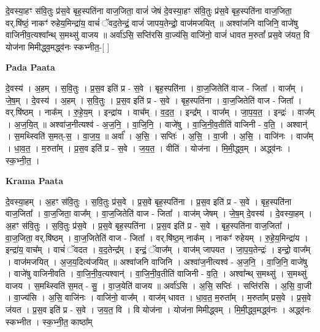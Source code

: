 \documentclass[17pt]{extarticle}
\begin{document}
दे॒वस्या॒हꣳ स॑वि॒तुः प्र॑स॒वे बृह॒स्पति॑ना वाज॒जिता॒ वाजं॑ जेषं दे॒वस्या॒हꣳ स॑वि॒तुः प्र॑स॒वे बृह॒स्पति॑ना वाज॒जिता॒ वर्.षि॑ष्ठं॒ नाकꣳ॑ रुहेय॒मिन्द्रा॑य॒ वाचं॑ ॅवद॒तेन्द्रं॒ वाजं॑ जापय॒तेन्द्रो॒ वाज॑मजयित् ॥ अश्वा॑जनि वाजिनि॒ वाजे॑षु वाजिनीव॒त्यश्वा᳚न्थ् स॒मथ्सु॑ वाजय ॥ अर्वा॑ऽसि॒ सप्ति॑रसि वा॒ज्य॑सि॒ वाजि॑नो॒ वाजं॑ धावत म॒रुतां᳚ प्रस॒वे ज॑यत॒ वि योज॑ना मिमीद्ध्व॒मद्ध्व॑नः स्कभ्नीत॒-[ ] \newline

\textbf{Pada Paata} \newline

दे॒वस्य॑ । अ॒हम् । स॒वि॒तुः । प्र॒स॒व इति॑ प्र - स॒वे । बृह॒स्पति॑ना । वा॒ज॒जितेति॑ वाज - जिता᳚ । वाज᳚म् । जे॒ष॒म् । दे॒वस्य॑ । अ॒हम् । स॒वि॒तुः । प्र॒स॒व इति॑ प्र - स॒वे । बृह॒स्पति॑ना । वा॒ज॒जितेति॑ वाज - जिता᳚ । वर्.षि॑ष्ठम् । नाक᳚म् । रु॒हे॒य॒म् । इन्द्रा॑य । वाच᳚म् । व॒द॒त॒ । इन्द्र᳚म् । वाज᳚म् । जा॒प॒य॒त॒ । इन्द्रः॑ । वाज᳚म् । अ॒ज॒यि॒त् ॥ अश्वा॑ज॒नीत्यश्व॑ - अ॒ज॒नि॒ । वा॒जि॒नि॒ । वाजे॑षु । वा॒जि॒नी॒व॒तीति॑ वाजिनी - व॒ति॒ । अश्वान्॑ । स॒मथ्स्विति॑ स॒मत्-स॒ । वा॒ज॒य॒ ॥ अर्वा᳚ । अ॒सि॒ । सप्तिः॑ । अ॒सि॒ । वा॒जी । अ॒सि॒ । वाजि॑नः । वाज᳚म् । धा॒व॒त॒ । म॒रुता᳚म् । प्र॒स॒व इति॑ प्र - स॒वे । ज॒य॒त॒ । वीति॑ । योज॑ना । मि॒मी॒द्ध्व॒म् । अद्ध्व॑नः । स्क॒भ्नी॒त॒ ।  \newline


\textbf{Krama Paata} \newline

दे॒वस्या॒हम् । अ॒हꣳ स॑वि॒तुः । स॒वि॒तुः प्र॑स॒वे । प्र॒स॒वे बृह॒स्पति॑ना । प्र॒स॒व इति॑ प्र - स॒वे । बृह॒स्पति॑ना वाज॒जिता᳚ । वा॒ज॒जिता॒ वाज᳚म् । वा॒ज॒जितेति॑ वाज - जिता᳚ । वाज॑म् जेषम् । जे॒ष॒म् दे॒वस्य॑ । दे॒वस्या॒हम् । अ॒हꣳ स॑वि॒तुः । स॒वि॒तुः प्र॑स॒वे । प्र॒स॒वे बृह॒स्पति॑ना । प्र॒स॒व इति॑ प्र - स॒वे । बृह॒स्पति॑ना वाज॒जिता᳚ । वा॒ज॒जिता॒ वर्.षि॑ष्ठम् । वा॒ज॒जितेति॑ वाज - जिता᳚ । वर्.षि॑ष्ठ॒म् नाक᳚म् । नाकꣳ॑ रुहेयम् । रु॒हे॒य॒मिन्द्रा॑य । इन्द्रा॑य॒ वाच᳚म् । वाचं॑ ॅवदत । व॒द॒तेन्द्र᳚म् । इन्द्रं॒ ॅवाज᳚म् । वाज॑म् जापयत । जा॒प॒य॒तेन्द्रः॑ । इन्द्रो॒ वाज᳚म् । वाज॑मजयित् । अ॒ज॒य॒दित्य॑जयित् ॥ अश्वा॑जनि वाजिनि । अश्वा॑ज॒नीत्यश्व॑ - अ॒ज॒नि॒ । वा॒जि॒नि॒ वाजे॑षु । वाजे॑षु वाजिनीवति । वा॒जि॒नी॒व॒त्यश्वान्॑ । वा॒जि॒नी॒व॒तीति॑ वाजिनी - व॒ति॒ । अश्वा᳚न्थ् स॒मथ्सु॑ । स॒मथ्सु॑ वाजय । स॒मथ्स्विति॑ स॒मत् - सु॒ । वा॒ज॒येति॑ वाजय ॥ अर्वा॑ऽसि । अ॒सि॒ सप्तिः॑ । सप्ति॑रसि । अ॒सि॒ वा॒जी । वा॒ज्य॑सि । अ॒सि॒ वाजि॑नः । वाजि॑नो॒ वाज᳚म् । वाज॑म् धावत । धा॒व॒त॒ म॒रुता᳚म् । म॒रुता᳚म् प्रस॒वे । प्र॒स॒वे ज॑यत । प्र॒स॒व इति॑ प्र - स॒वे । ज॒य॒त॒ वि । वि योज॑ना । योज॑ना मिमीद्ध्वम् । मि॒मी॒द्ध्व॒मद्ध्व॑नः । अद्ध्व॑नः स्कभ्नीत । स्क॒भ्नी॒त॒ काष्ठा᳚म् \newline
\end{document}
